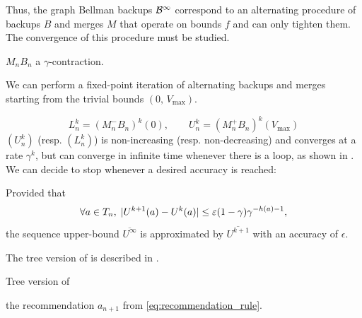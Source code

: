 \documentclass[runningheads]{llncs}
\begin{document}
Thus, the graph Bellman backups $\mathcal{B}^\infty$ correspond to an alternating procedure of backups $B$ and  merges $M$ that operate on bounds $f$ and can only tighten them. The convergence of this procedure must be studied.

\begin{proposition}[Contractivity of $M_nB_n$]
	\label{prop:contractivity}
	$M_n B_n$ a $\gamma$-contraction.
\end{proposition}

We can perform a fixed-point iteration of alternating backups and merges starting from the trivial bounds $(0,\, V_{\max})$.

\begin{equation}
\label{eq:recursion}
L_n^k = (M_n^- B_n)^k(0), \qquad
U_n^k = (M_n^+ B_n)^k(V_{\max})
\end{equation}
$(U_n^k)$ (resp. $(L_n^k)$) is non-increasing (resp. non-decreasing) and converges at a rate $\gamma^k$, but can converge in infinite time whenever there is a loop, as shown in . We can decide to stop whenever a desired accuracy is reached: 

\begin{proposition}
	\label{prop:early-stopping}
	Provided that
	\[\forall a\in T_n,\; |U^{k+1}(a) - U^k(a)| \leq \varepsilon (1-\gamma)\gamma^{-h(a)-1},\]
	the sequence upper-bound $\overline{U^{\infty}}$ is approximated by $\overline{U^{k+1}}$ with an accuracy of $\epsilon$.
\end{proposition}


The tree version of  is described in .\\
\begin{algorithm}[H]
	\caption{Tree version of }
	\label{alg:gbop-t}
	\DontPrintSemicolon
	\Return the recommendation $a_{n+1}$ from \eqref{eq:recommendation_rule}.\;
\end{algorithm}
\end{document}
